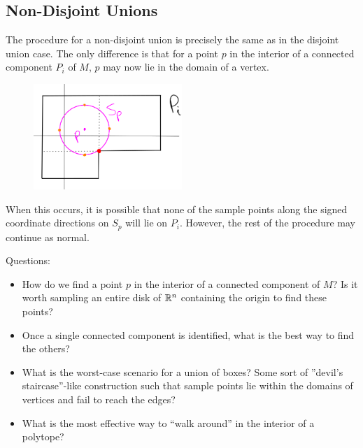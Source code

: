 \documentclass[12pt]{article}
\begin{document}
\begin{flushleft}
\subsection{Non-Disjoint Unions}

The procedure for a non-disjoint union is precisely the same as in the disjoint union case.
The only difference is that for a point $p$ in the interior of a connected component $P_i$ of $M$, $p$ may now lie in the domain of a vertex.
\begin{figure}[H]
	\centering
	\includegraphics[width=0.5\textwidth]{connected_component.png}
\end{figure}
When this occurs, it is possible that none of the sample points along the signed coordinate directions on $S_p$ will lie on $P_i$.
However, the rest of the procedure may continue as normal.

Questions:
\begin{itemize}
	\item How do we find a point $p$ in the interior of a connected component of $M$?
		Is it worth sampling an entire disk of $\mathbb{R}^n$ containing the origin to find these points?
	\item Once a single connected component is identified, what is the best way to find the others?
	\item What is the worst-case scenario for a union of boxes?
		Some sort of ''devil's staircase''-like construction such that sample points lie within the domains of vertices and fail to reach the edges?
	\item What is the most effective way to ``walk around'' in the interior of a polytope?
\end{itemize}


































\end{flushleft}
\end{document}
